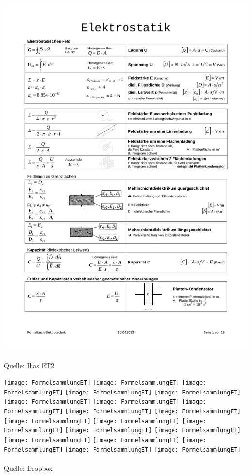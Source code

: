 \includegraphics[page=19,scale=0.57,trim=20mm 20mm 20mm 20mm]{ET-Formelsammlung}
\\
\\
Quelle: Ilias ET2
\newpage

\texttt{[image: FormelsammlungET]}\newpage
\texttt{[image: FormelsammlungET]}\newpage
\texttt{[image: FormelsammlungET]}\newpage
\texttt{[image: FormelsammlungET]}\newpage
\texttt{[image: FormelsammlungET]}\newpage
\texttt{[image: FormelsammlungET]}\newpage
\texttt{[image: FormelsammlungET]}\newpage
\texttt{[image: FormelsammlungET]}\newpage
\texttt{[image: FormelsammlungET]}\newpage
\texttt{[image: FormelsammlungET]}\newpage
\texttt{[image: FormelsammlungET]}\newpage
\texttt{[image: FormelsammlungET]}\newpage
\texttt{[image: FormelsammlungET]}\newpage
\texttt{[image: FormelsammlungET]}\newpage
\texttt{[image: FormelsammlungET]}\newpage
\texttt{[image: FormelsammlungET]}\newpage
\texttt{[image: FormelsammlungET]}\newpage
\texttt{[image: FormelsammlungET]}\newpage
\texttt{[image: FormelsammlungET]}\newpage
\texttt{[image: FormelsammlungET]}
\\
\\
Quelle: Dropbox 
\newpage

